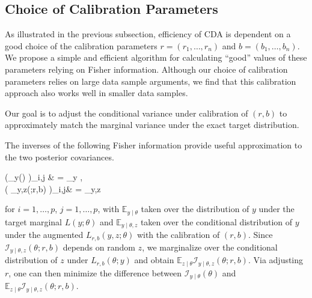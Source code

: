 \documentclass[11pt]{article}
\newcommand{\be}{\begin{equs}}
\newcommand{\ee}{\end{equs}}
\newcommand{\bb}[1]{\mathbb{#1}}
\newcommand{\mc}[1]{\mathcal{#1}}
\begin{document}
\subsection{Choice of Calibration Parameters} \label{sec:tuning}
As illustrated in the previous subsection, efficiency of CDA is dependent on a good choice of the calibration parameters $r=(r_1,\ldots,r_n)$ and $b=(b_1,\ldots,b_n)$.  We propose a simple and efficient algorithm for calculating ``good'' values of these parameters relying on Fisher information.  {Although our choice of calibration parameters relies on large data sample arguments, we find that this calibration approach also works well in smaller data samples.}

{
Our
goal is to adjust the conditional variance under calibration of $(r,b)$ to approximately match the marginal variance under the exact target distribution.
{
The inverses of the following Fisher information provide  useful approximation to the two posterior covariances.

\be   \left (\mc I_{y\mid \theta}({\theta}) \right)_{i,j} &  = \bb E_{y\mid \theta} , \\
 \left(  \mc I_{y\mid \theta,z}({\theta};r,b) \right)_{i,j}& = \bb E_{y\mid \theta,z} 
\ee
}
for $i=1,\ldots,p$, $j=1,\ldots,p$, with $\bb E_{y\mid \theta}$ taken over the distribution of $y$ under the target marginal $L(y;\theta)$ and $\bb E_{y\mid \theta,z}$ taken over the conditional distribution of $y$ under the augmented $L_{r,b}(y,z;\theta)$ with the calibration of $(r,b)$.
Since $\mc I_{y\mid \theta,z}({\theta};r,b)$ depends on random $z$, we marginalize over
the conditional distribution
of $z$ under $L_{r,b}(\theta; y)$ and obtain $\bb E_{z\mid \theta}\mc I_{y\mid \theta,z}(\theta;r,b)$. Via adjusting $r$, one can then  minimize the difference between $\mc  I_{y\mid \theta}(\theta)$
and $\bb E_{z\mid \theta}\mc I_{y\mid \theta,z}(\theta;r,b)$.}
\end{document}
